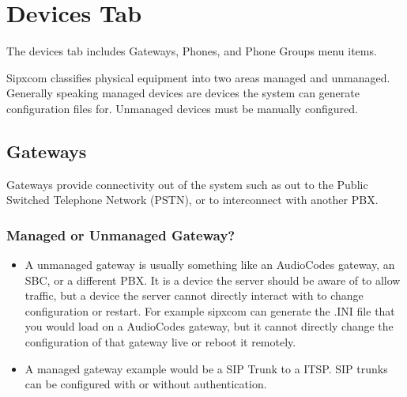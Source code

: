 \documentclass[letterpaper,10pt,english]{sphinxmanual}
\begin{document}
\section{Devices Tab}
\label{\detokenize{webui:devices-tab}}\label{\detokenize{webui:devices}}\begin{quote}

\end{quote}

The devices tab includes Gateways, Phones, and Phone Groups menu items.

Sipxcom classifies physical equipment into two areas \textendash{} managed and unmanaged. Generally speaking managed devices are devices the system can generate configuration files for. Unmanaged devices must be manually configured.


\subsection{Gateways}
\label{\detokenize{webui:gateways}}
Gateways provide connectivity out of the system such as out to the Public Switched Telephone Network (PSTN), or to interconnect with another PBX.


\subsubsection{Managed or Unmanaged Gateway?}
\label{\detokenize{webui:managed-or-unmanaged-gateway}}\begin{quote}

\end{quote}
\begin{itemize}
\item {} 
A unmanaged gateway is usually something like an AudioCodes gateway, an SBC, or a different PBX. It is a device the server should be aware of to allow traffic, but a device the server cannot directly interact with to change configuration or restart. For example sipxcom can generate the .INI file that you would load on a AudioCodes gateway, but it cannot directly change the configuration of that gateway live or reboot it remotely.

\item {} 
A managed gateway example would be a SIP Trunk to a ITSP. SIP trunks can be configured with or without authentication.

\end{itemize}
\end{document}
